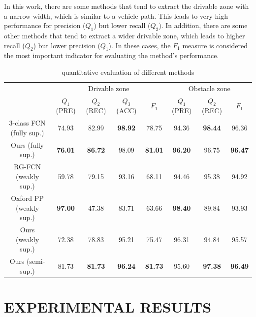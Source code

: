 \documentclass[letterpaper, 10 pt, conference]{ieeeconf}  %
\begin{document}
In this work, there are some methods that tend to extract the drivable zone with a narrow-width, which is similar to a vehicle path. This leads to very high performance for precision ($Q_1$) but lower recall ($Q_2$). In addition, there are some other methods that tend to extract a wider drivable zone, which leads to higher recall ($Q_2$) but lower precision ($Q_1$). In these cases, the $F_1$ measure is considered the most important indicator for evaluating the method’s performance.

\begin{table}[b]
	\caption{quantitative evaluation of different methods}
	\label{tab:all_result}
	\centering
	\renewcommand{\arraystretch}{1.5}
	\begin{tabular}{c|cccc|ccc}
		\hline
		& \multicolumn{4}{c|}{Drivable zone}                                & \multicolumn{3}{c}{Obstacle zone}               \\ \cline{2-8} 
		& $Q_1$ (PRE)    & $Q_2$ (REC)    & $Q_3$ (ACC)    & $F_1$          & $Q_1$ (PRE)    & $Q_2$ (REC)    & $F_1$          \\ \hline
		3-class FCN (fully sup.) & 74.93          & 82.99          & \textbf{98.92} & 78.75          & 94.36          & \textbf{98.44} & 96.36          \\
		Ours (fully sup.)        & \textbf{76.01} & \textbf{86.72} & 98.09          & \textbf{81.01} & \textbf{96.20} & 96.75          & \textbf{96.47} \\ \hline
		RG-FCN (weakly sup.)     & 59.78          & {79.15}        & 93.16          & 68.11          & 94.46          & {95.38}        & 94.92          \\
		Oxford PP (weakly sup.)  & \textbf{97.00} & 47.38          & 83.71          & 63.66          & \textbf{98.40} & 89.84          & 93.93          \\
		Ours (weakly sup.)       & 72.38          & 78.83          & {95.21}        & {75.47}        & {96.31}        & 94.84          & {95.57}        \\
		Ours (semi-sup.)         & {81.73}        & \textbf{81.73} & \textbf{96.24} & \textbf{81.73} & 95.60          & \textbf{97.38} & \textbf{96.49} \\ \hline
	\end{tabular}
\end{table}

\section{EXPERIMENTAL RESULTS}	\label{sec:experiment}
\end{document}
